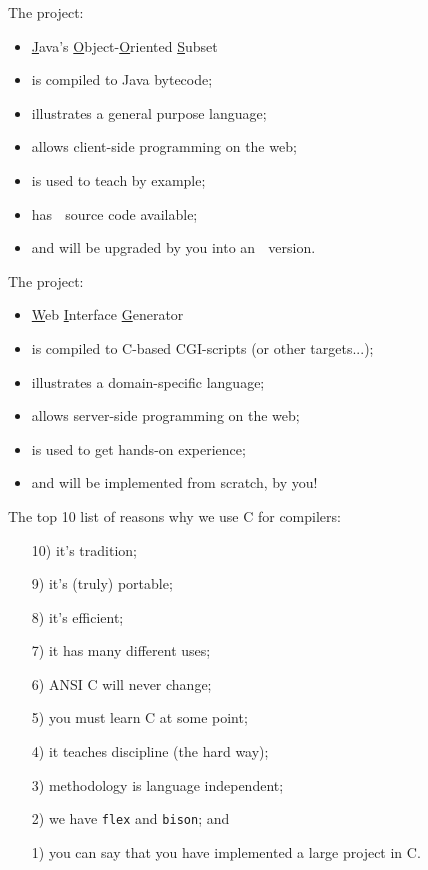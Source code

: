 \begin{slide*}
The  project:
\begin{itemize}
\item \underline{J}ava's \underline{O}bject-\underline{O}riented \underline{S}ubset
\item is compiled to Java bytecode;
\item illustrates a general purpose language;
\item allows client-side programming on the web;
\item is used to teach by example;
\item has $\;$ source code available;
\item and will be upgraded by you into an $\;$ version.
\end{itemize}
\vfil
\end{slide*}
 
\begin{slide*}
The  project:
\begin{itemize}
\item \underline{W}eb \underline{I}nterface \underline{G}enerator
\item is compiled to C-based CGI-scripts (or other targets...);
\item illustrates a domain-specific language;
\item allows server-side programming on the web;
\item is used to get hands-on experience;
\item and will be implemented from scratch, by you!
\end{itemize}
\vfil
\end{slide*}

\begin{slide*}
The top 10 list of reasons why we use C for compilers:\\

\begin{itemize}
\item[10)] it's tradition;
\item[9)] it's (truly) portable;
\item[8)] it's efficient;
\item[7)] it has many different uses;
\item[6)] ANSI C will never change;
\item[5)] you must learn C at some point;
\item[4)] it teaches discipline (the hard way);
\item[3)] methodology is language independent;
\item[2)] we have {\tt flex} and {\tt bison}; and
\item[1)] you can say that you have implemented a large project in C.
\end{itemize}
\vfil
\end{slide*}


